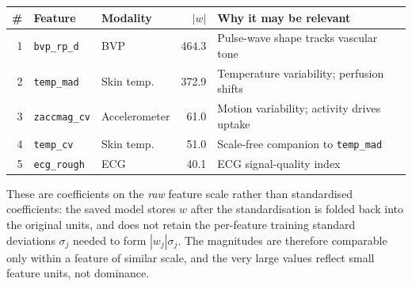 \documentclass[10pt,a4paper]{article}
\newcommand{\feat}[1]{\texttt{\small #1}}
\begin{document}
\begin{table}[h]
\centering\small
\begin{tabular}{@{}rllr p{5.4cm}@{}}
\toprule
\# & \textbf{Feature} & \textbf{Modality} & $|w|$ & \textbf{Why it may be relevant} \\
\midrule
1 & \feat{bvp\_rp\_d} & BVP & 464.3 & Pulse-wave shape tracks vascular tone \\
2 & \feat{temp\_mad} & Skin temp. & 372.9 & Temperature variability; perfusion shifts \\
3 & \feat{zaccmag\_cv} & Accelerometer & 61.0 & Motion variability; activity drives uptake \\
4 & \feat{temp\_cv} & Skin temp. & 51.0 & Scale-free companion to \feat{temp\_mad} \\
5 & \feat{ecg\_rough} & ECG & 40.1 & ECG signal-quality index \\
\bottomrule
\end{tabular}
\end{table}

These are coefficients on the \emph{raw} feature scale rather than standardised
coefficients: the saved model stores $w$ after the standardisation is folded back
into the original units, and does not retain the per-feature training standard
deviations $\sigma_j$ needed to form $|w_j|\sigma_j$. The magnitudes are therefore
comparable only within a feature of similar scale, and the very large values reflect
small feature units, not dominance.

%
%
\end{document}
